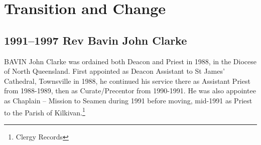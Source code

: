 \printendnotes[custom]
\setcounter{endnote}{0}




\chapter{Transition and Change}
\nobalance


\section{1991--1997 Rev Bavin John Clarke}



\lettrine[lines=3]{B}{AVIN}
 John Clarke was ordained both Deacon and Priest in 1988, in the Diocese of North Queensland. First appointed as Deacon Assistant to St James' Cathedral, Townsville in 1988, he continued his service there as Assistant Priest from 1988-1989, then as Curate/Precentor from 1990-1991. He was also appointee as Chaplain -- Mission to Seamen during 1991 before moving, mid-1991 as Priest to the Parish of Kilkivan.\footnote{Clergy Records}







